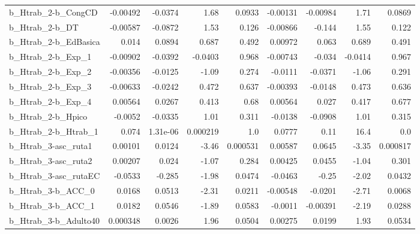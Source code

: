 \begin{tabular}{lrrrrrrrr}
b\_Htrab\_2-b\_CongCD         &    -0.00492 &      -0.0374 &      1.68 &   0.0933 &   -0.00131 &    -0.00984 &         1.71 &        0.0869 \\
b\_Htrab\_2-b\_DT             &    -0.00587 &      -0.0872 &      1.53 &    0.126 &   -0.00866 &      -0.144 &         1.55 &         0.122 \\
b\_Htrab\_2-b\_EdBasica       &       0.014 &       0.0894 &     0.687 &    0.492 &    0.00972 &       0.063 &        0.689 &         0.491 \\
b\_Htrab\_2-b\_Exp\_1          &    -0.00902 &      -0.0392 &   -0.0403 &    0.968 &   -0.00743 &      -0.034 &      -0.0414 &         0.967 \\
b\_Htrab\_2-b\_Exp\_2          &    -0.00356 &      -0.0125 &     -1.09 &    0.274 &    -0.0111 &     -0.0371 &        -1.06 &         0.291 \\
b\_Htrab\_2-b\_Exp\_3          &    -0.00633 &      -0.0242 &     0.472 &    0.637 &   -0.00393 &     -0.0148 &        0.473 &         0.636 \\
b\_Htrab\_2-b\_Exp\_4          &     0.00564 &       0.0267 &     0.413 &     0.68 &    0.00564 &       0.027 &        0.417 &         0.677 \\
b\_Htrab\_2-b\_Hpico          &     -0.0052 &      -0.0335 &      1.01 &    0.311 &    -0.0138 &     -0.0908 &         1.01 &         0.315 \\
b\_Htrab\_2-b\_Htrab\_1        &       0.074 &     1.31e-06 &  0.000219 &      1.0 &     0.0777 &        0.11 &         16.4 &           0.0 \\
b\_Htrab\_3-asc\_ruta1        &     0.00101 &       0.0124 &     -3.46 & 0.000531 &    0.00587 &      0.0645 &        -3.35 &      0.000817 \\
b\_Htrab\_3-asc\_ruta2        &     0.00207 &        0.024 &     -1.07 &    0.284 &    0.00425 &      0.0455 &        -1.04 &         0.301 \\
b\_Htrab\_3-asc\_rutaEC       &     -0.0533 &       -0.285 &     -1.98 &   0.0474 &    -0.0463 &       -0.25 &        -2.02 &        0.0432 \\
b\_Htrab\_3-b\_ACC\_0          &      0.0168 &       0.0513 &     -2.31 &   0.0211 &   -0.00548 &     -0.0201 &        -2.71 &        0.0068 \\
b\_Htrab\_3-b\_ACC\_1          &      0.0182 &       0.0546 &     -1.89 &   0.0583 &    -0.0011 &    -0.00391 &        -2.19 &        0.0288 \\
b\_Htrab\_3-b\_Adulto40       &    0.000348 &       0.0026 &      1.96 &   0.0504 &    0.00275 &      0.0199 &         1.93 &        0.0534 \\

\end{tabular}
